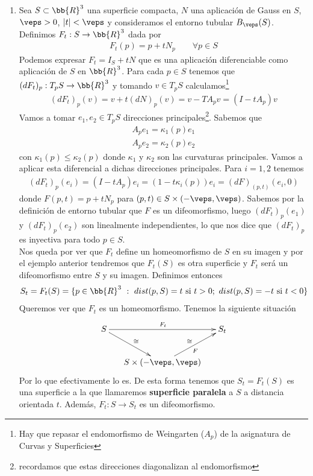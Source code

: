 \begin{ejemplo}
\begin{enumerate}
        \item Sea $S\subset \bb{R}^3$ una superficie compacta, $N$ una aplicación de Gauss en $S$, $\veps>0$, $|t|<\veps$ y consideramos el entorno tubular $B_\veps(S)$. Definimos $F_t: S \to \bb{R}^3$ dada por 
        \begin{gather*}
            F_t(p) = p + tN_p \qquad \forall p \in S
        \end{gather*}
        Podemos expresar $F_t = I_S + tN$ que es una aplicación diferenciable como aplicación de $S$ en $\bb{R}^3$. Para cada $p\in S$ tenemos que $(dF_t)_p : T_pS \to \bb{R}^3$ y tomando $v\in T_pS$ calculamos\footnote{Hay que repasar el endomorfismo de Weingarten ($A_p$) de la asignatura de Curvas y Superficies}
        \begin{gather*}
            (dF_t)_p(v) = v + t(dN)_p(v) = v - TA_p v = (I-tA_p)v
        \end{gather*}
        Vamos a tomar $e_1, e_2\in T_pS$ direcciones principales\footnote{recordamos que estas direcciones diagonalizan al endomorfismo}. Sabemos que 
        \begin{gather*}
            A_pe_1 = \kappa_1(p)e_1\\
            A_pe_2 = \kappa_2(p)e_2
        \end{gather*}
        con $\kappa_1(p)\leq \kappa_2(p)$ donde $\kappa_1$ y $\kappa_2$ son las curvaturas principales. Vamos a aplicar esta diferencial a dichas direcciones principales. Para $i=1,2$ tenemos
        \begin{gather*}
            (dF_t)_p(e_i) = (I-tA_p)e_i = (1-t\kappa_i(p))e_i = (dF)_(p,t)(e_i, 0)
        \end{gather*}
        donde $F(p,t) = p+tN_p$ para $(p,t)\in S\times(-\veps, \veps)$. Sabemos por la definición de entorno tubular que $F$ es un difeomorfismo, luego $(dF_t)_p(e_1)$ y $(dF_t)_p(e_2)$ son linealmente independientes, lo que nos dice que $(dF_t)_p$ es inyectiva para todo $p\in S$.\\

        Nos queda por ver que $F_t$ define un homeomorfismo de $S$ en su imagen y por el ejemplo anterior tendremos que $F_t(S)$ es otra superficie y $F_t$ será un difeomorfismo entre $S$ y su imagen. Definimos entonces
        \begin{gather*}
            S_t = F_t(S) = \{p\in \bb{R}^3 \ : \ dist(p,S)=t \text{ si }t>0;\ dist(p,S)=-t \text{ si }t<0\}
        \end{gather*}
        Queremos ver que $F_t$ es un homeomorfismo. Tenemos la siguiente situación
        \begin{gather*}
            \xymatrix@C=5mm{
                S \ar[rr]^{F_t} \ar[rd]^{\cong} & & S_t\\
                & S\times(-\veps, \veps) \ar[ur]_{F}^{\cong}
            }
        \end{gather*}
        Por lo que efectivamente lo es. De esta forma tenemos que $S_t=F_t(S)$ es una superficie a la que llamaremos \textbf{superficie paralela} a $S$ a distancia orientada $t$. Además, $F_t: S \to S_t$ es un difeomorfismo.\\


\end{enumerate}
\end{ejemplo}
